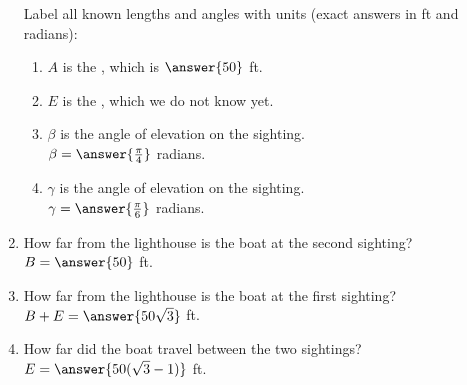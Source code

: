 \documentclass{ximera}
\begin{document}
\begin{exercise}
\begin{enumerate}
Label all known lengths and angles with units (exact answers in ft and radians):
\begin{enumerate}
\item $A$ is the , which is $\answer{50}$ ft. 

\item $E$ is the , which we do not know yet.

\item $\beta$ is the angle of elevation on the  sighting. \smallskip\\
$\beta = \answer{\frac{\pi}{4}}$ radians.

\item $\gamma$ is the angle of elevation on the  sighting. \smallskip\\
$\gamma = \answer{\frac{\pi}{6}}$ radians.
\end{enumerate}

\item How far from the lighthouse is the boat at the second sighting? $B = \answer{50}$ ft.

\item How far from the lighthouse is the boat at the first sighting? $B + E = \answer{50\sqrt{3}}$ ft.

\item How far did the boat travel between the two sightings? $E = \answer{50(\sqrt{3} - 1)}$ ft.

\end{enumerate}

\end{exercise}
\end{document}
